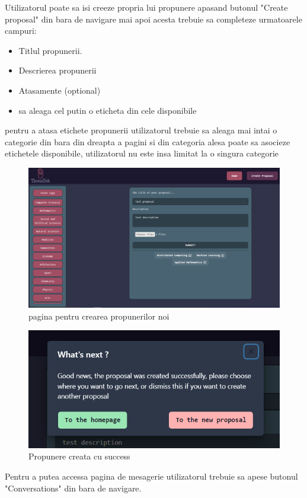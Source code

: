 \documentclass[12pt,a4paper,hidelinks]{report}
\theoremstyle{definition}
\theoremstyle{remark}
\begin{document}
Utilizatorul poate sa isi creeze propria lui propunere apasand butonul "Create proposal" din bara de navigare
mai apoi acesta trebuie sa completeze urmatoarele campuri:
\begin{itemize}
    \item Titlul propunerii.
    \item Descrierea propunerii
    \item Atasamente (optional)
    \item sa aleaga cel putin o eticheta din cele disponibile
\end{itemize}
pentru a atasa etichete propunerii utilizatorul trebuie sa aleaga mai intai o categorie din bara din dreapta a pagini 
si din categoria alesa poate sa asocieze etichetele disponibile, utilizatorul nu este insa limitat la o singura categorie
\begin{figure}[H]
    \centering
    \includegraphics[scale=0.4]{images/CreateProposalPage.PNG}
    \caption{pagina pentru crearea propunerilor noi}
\end{figure}
\begin{figure}[H]
    \centering
    \includegraphics[scale=0.7]{images/ProposalCreated.PNG}
    \caption{Propunere creata cu success}
\end{figure}
Pentru a putea accessa pagina de mesagerie utilizatorul trebuie sa apese butonul "Conversations" din bara de navigare.
\end{document}

